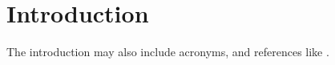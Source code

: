 \chapter{Introduction}
\label{chap:Introduction}

The introduction may also include acronyms, and references like \cite{ni_esim_2017}.
